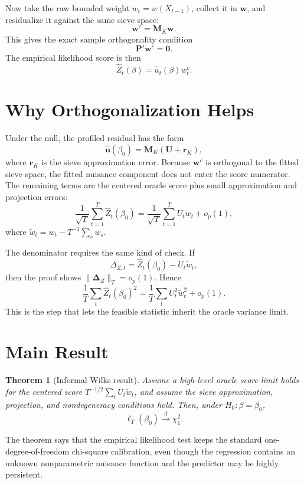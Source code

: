 \documentclass[11pt]{article}
\newtheorem{theorem}{Theorem}
\begin{document}
Now take the raw bounded weight \(w_t=w(X_{t-1})\), collect it in \(\bm w\), and residualize it against the same sieve space:
\begin{equation}
    \bm w^c=\bm M_K\bm w.
    \label{eq:expo-weight}
\end{equation}
This gives the exact sample orthogonality condition
\[
    \bm P'\bm w^c=\bm0.
\]
The empirical likelihood score is then
\begin{equation}
    \widehat Z_t(\beta)=\widehat u_t(\beta)w_t^c.
    \label{eq:expo-score}
\end{equation}

\section{Why Orthogonalization Helps}

Under the null, the profiled residual has the form
\[
    \widehat{\bm u}(\beta_0)=\bm M_K(\bm U+\bm r_K),
\]
where \(\bm r_K\) is the sieve approximation error. Because \(\bm w^c\) is orthogonal to the fitted sieve space, the fitted nuisance component does not enter the score numerator. The remaining terms are the centered oracle score plus small approximation and projection errors:
\[
    \frac1{\sqrt T}\sum_{t=1}^T\widehat Z_t(\beta_0)
    =\frac1{\sqrt T}\sum_{t=1}^TU_t\widetilde w_t+o_p(1),
\]
where \(\widetilde w_t=w_t-T^{-1}\sum_s w_s\).

The denominator requires the same kind of check. If
\[
    \Delta_{Z,t}=\widehat Z_t(\beta_0)-U_t\widetilde w_t,
\]
then the proof shows \(\|\bm\Delta_Z\|_T=o_p(1)\). Hence
\[
    \frac1T\sum_t\widehat Z_t(\beta_0)^2
    =\frac1T\sum_tU_t^2\widetilde w_t^2+o_p(1).
\]
This is the step that lets the feasible statistic inherit the oracle variance limit.

\section{Main Result}

\begin{theorem}[Informal Wilks result]
Assume a high-level oracle score limit holds for the centered score \(T^{-1/2}\sum_tU_t\widetilde w_t\), and assume the sieve approximation, projection, and nondegeneracy conditions hold. Then, under \(H_0:\beta=\beta_0\),
\[
    \ell_T(\beta_0)\xrightarrow{d}\chi_1^2.
\]
\end{theorem}

The theorem says that the empirical likelihood test keeps the standard one-degree-of-freedom chi-square calibration, even though the regression contains an unknown nonparametric nuisance function and the predictor may be highly persistent.
\end{document}
